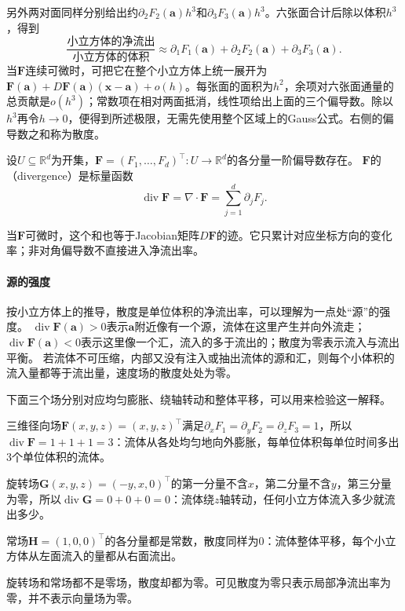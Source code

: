 另外两对面同样分别给出约$\partial_2F_2(\bm a)h^3$和$\partial_3F_3(\bm a)h^3$。六张面合计后除以体积$h^3$，得到
\[
 \frac{\text{小立方体的净流出}}{\text{小立方体的体积}}
 \approx\partial_1F_1(\bm a)+\partial_2F_2(\bm a)+\partial_3F_3(\bm a).
\]
当$\bm F$连续可微时，可把它在整个小立方体上统一展开为$\bm F(\bm a)+D\bm F(\bm a)(\bm x-\bm a)+o(h)$。每张面的面积为$h^2$，余项对六张面通量的总贡献是$o(h^3)$；常数项在相对两面抵消，线性项给出上面的三个偏导数。除以$h^3$再令$h\to0$，便得到所述极限，无需先使用整个区域上的Gauss公式。右侧的偏导数之和称为散度。
\begin{definition}[散度]
\label{def:multivariable-divergence}
设$U\subseteq\mathbb R^d$为开集，$\bm F=(F_1,\ldots,F_d)^\top:U\to\mathbb R^d$的各分量一阶偏导数存在。
$\bm F$的（divergence）是标量函数
\[
 \operatorname{div}\bm F
 =\nabla\mathbin{\cdot}\bm F
 =\sum_{j=1}^d\partial_jF_j.
\]
\end{definition}
当$\bm F$可微时，这个和也等于Jacobian矩阵$D\bm F$的迹。它只累计对应坐标方向的变化率；非对角偏导数不直接进入净流出率。

\paragraph{源的强度}

按小立方体上的推导，散度是单位体积的净流出率，可以理解为一点处“源”的强度。
$\operatorname{div}\bm F(\bm a)>0$表示$\bm a$附近像有一个源，流体在这里产生并向外流走；$\operatorname{div}\bm F(\bm a)<0$表示这里像一个汇，流入的多于流出的；散度为零表示流入与流出平衡。
若流体不可压缩，内部又没有注入或抽出流体的源和汇，则每个小体积的流入量都等于流出量，速度场的散度处处为零。

下面三个场分别对应均匀膨胀、绕轴转动和整体平移，可以用来检验这一解释。
\begin{example}
三维径向场$\bm F(x,y,z)=(x,y,z)^\top$满足$\partial_xF_1=\partial_yF_2=\partial_zF_3=1$，所以$\operatorname{div}\bm F=1+1+1=3$：流体从各处均匀地向外膨胀，每单位体积每单位时间多出$3$个单位体积的流体。

旋转场$\bm G(x,y,z)=(-y,x,0)^\top$的第一分量不含$x$，第二分量不含$y$，第三分量为零，所以$\operatorname{div}\bm G=0+0+0=0$：流体绕$z$轴转动，任何小立方体流入多少就流出多少。

常场$\bm H=(1,0,0)^\top$的各分量都是常数，散度同样为$0$：流体整体平移，每个小立方体从左面流入的量都从右面流出。
\end{example}
旋转场和常场都不是零场，散度却都为零。可见散度为零只表示局部净流出率为零，并不表示向量场为零。

